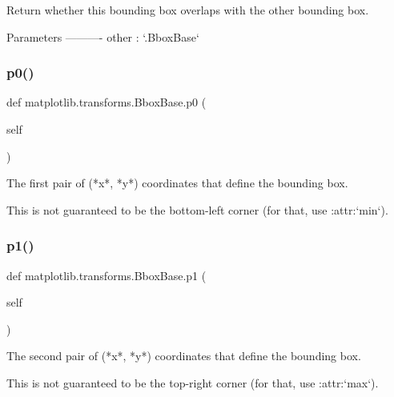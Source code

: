 \begin{DoxyVerb}Return whether this bounding box overlaps with the other bounding box.

Parameters
----------
other : `.BboxBase`
\end{DoxyVerb}
 \mbox{\label{classmatplotlib_1_1transforms_1_1BboxBase_a7a1e5f642d7ef7fd73ba66e184bc14c3}} 
\subsubsection{\texorpdfstring{p0()}{p0()}}
{\footnotesize\ttfamily def matplotlib.\+transforms.\+Bbox\+Base.\+p0 (\begin{DoxyParamCaption}\item[{}]{self }\end{DoxyParamCaption})}

\begin{DoxyVerb}The first pair of (*x*, *y*) coordinates that define the bounding box.

This is not guaranteed to be the bottom-left corner (for that, use
:attr:`min`).
\end{DoxyVerb}
 \mbox{\label{classmatplotlib_1_1transforms_1_1BboxBase_a3bf4314c0bea6d32b502634dc0b298cf}} 
\subsubsection{\texorpdfstring{p1()}{p1()}}
{\footnotesize\ttfamily def matplotlib.\+transforms.\+Bbox\+Base.\+p1 (\begin{DoxyParamCaption}\item[{}]{self }\end{DoxyParamCaption})}

\begin{DoxyVerb}The second pair of (*x*, *y*) coordinates that define the bounding box.

This is not guaranteed to be the top-right corner (for that, use
:attr:`max`).
\end{DoxyVerb}
 \mbox{\label{classmatplotlib_1_1transforms_1_1BboxBase_aa6e63bed78104b50ff7509b944ac5e0a}} 
